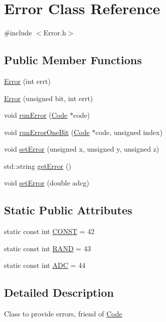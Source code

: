 \hypertarget{class_error}{}\section{Error Class Reference}
\label{class_error}


{\ttfamily \#include $<$Error.\+h$>$}

\subsection*{Public Member Functions}
\begin{DoxyCompactItemize}
\item 
\hyperlink{class_error_af749bf9f766e8139c7e26cd2ef6982cf}{Error} (int errt)
\item 
\hyperlink{class_error_a754d76d6fd93c4c278f62def18070e0c}{Error} (unsigned bit, int errt)
\item 
void \hyperlink{class_error_a54160b22c0c970e5a699a9f9eb3c6544}{run\+Error} (\hyperlink{class_code}{Code} $\ast$code)
\item 
void \hyperlink{class_error_a1d0f3af05cddc0b4314ce606e280acd6}{run\+Error\+One\+Bit} (\hyperlink{class_code}{Code} $\ast$code, unsigned index)
\item 
void \hyperlink{class_error_a80966bf786c23265085e3f1a521cc56c}{set\+Error} (unsigned x, unsigned y, unsigned z)
\item 
std\+::string \hyperlink{class_error_aa2aec02f62fb7e8325c5bb793da64a90}{get\+Error} ()
\item 
void \hyperlink{class_error_acc31b7d7ac4345350495021eacf9b7bf}{set\+Error} (double adcg)
\end{DoxyCompactItemize}
\subsection*{Static Public Attributes}
\begin{DoxyCompactItemize}
\item 
static const int \hyperlink{class_error_a0f92db18254bcb69e96363e3cc696453}{C\+O\+N\+ST} = 42
\item 
static const int \hyperlink{class_error_aa2dfc83f8a57b08d80000df840fd2103}{R\+A\+ND} = 43
\item 
static const int \hyperlink{class_error_a638ef052fbe781ece5b3604e1bbce4ea}{A\+DC} = 44
\end{DoxyCompactItemize}


\subsection{Detailed Description}
Class to provide errors, friend of \hyperlink{class_code}{Code} 

